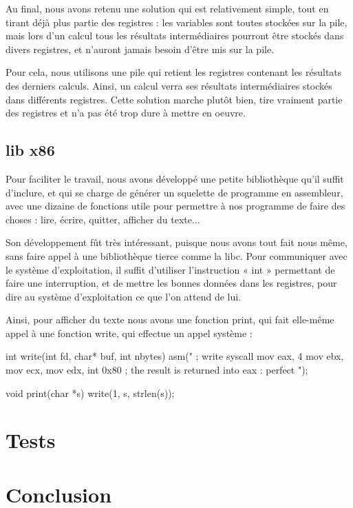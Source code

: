 \documentclass{scrartcl}
\begin{document}
Au final, nous avons retenu une solution qui est relativement simple, tout en tirant déjà plus
partie des registres : les variables sont toutes stockées sur la pile, mais lors d'un calcul
tous les résultats intermédiaires pourront être stockés dans divers registres, et n'auront jamais
besoin d'être mis sur la pile.

Pour cela, nous utilisons une pile qui retient les registres contenant les résultats
des derniers calculs. Ainsi, un calcul verra ses résultats intermédiaires stockés dans différents
registres. Cette solution marche plutôt bien, tire vraiment partie des registres et n'a pas été
trop dure à mettre en oeuvre.

\subsection{lib x86}

Pour faciliter le travail, nous avons développé une petite bibliothèque qu'il suffit d'inclure,
et qui se charge de générer un squelette de programme en assembleur, avec une dizaine de 
fonctions utile pour permettre à nos programme de faire des choses : lire, écrire, quitter,
afficher du texte...

Son développement fût très intéressant, puisque nous avons tout fait nous même, sans faire
appel à une bibliothèque tierce comme la libc.
Pour communiquer avec le système d'exploitation, il suffit d'utiliser l'instruction « int »
permettant de faire une interruption, et de mettre les bonnes données dans les registres,
pour dire au système d'exploitation ce que l'on attend de lui.

Ainsi, pour afficher du texte nous avons une fonction print, qui fait elle-même appel à une fonction
write, qui effectue un appel système :
\begin{moccode}
int write(int fd, char* buf, int nbytes) {
    asm("
        ; write syscall
        mov eax, 4
        mov ebx, %
        mov ecx, %
        mov edx, %
        int 0x80 ; the result is returned into eax : perfect
    ");
}

void print(char *s) {
    write(1, s, strlen(s));
}
\end{moccode}


\section{Tests}

\section{Conclusion}
\end{document}
